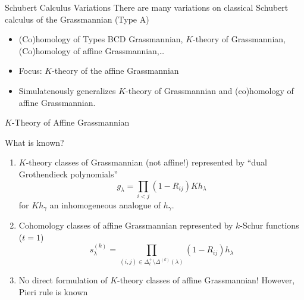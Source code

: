 \documentclass{beamer}
\begin{document}
\begin{frame}{Schubert Calculus Variations}
  There are many variations on classical Schubert calculus of the
  Grassmannian (Type A)
  \begin{itemize}
  \item (Co)homology of Types BCD Grassmannian, \(K\)-theory of
    Grassmannian, (Co)homology of affine Grassmannian,\ldots 
  \item Focus: \(K\)-theory of the affine Grassmannian
  \item Simulatenously generalizes \(K\)-theory of Grassmannian and
    (co)homology of affine Grassmannian. 
  \end{itemize}
\end{frame}
\begin{frame}{\(K\)-Theory of Affine Grassmannian}
  \begin{block}{What is known?}
    \begin{enumerate}
    \item \(K\)-theory classes of Grassmannian (not affine!)
      represented by
      ``dual Grothendieck 
      polynomials'' \[
        g_\lambda = \prod_{i < j} (1-R_{ij}) Kh_\lambda
      \]
      for \(Kh_\gamma\) an inhomogeneous analogue of \(h_\gamma\).
    \item Cohomology classes of affine Grassmannian represented by
      \(k\)-Schur functions (\(t=1\)) \[
        s_\lambda^{(k)} = \prod_{(i,j) \in \Delta^+_\ell \setminus
          \Delta^{(k)}(\lambda)} (1-R_{ij}) h_\lambda
      \]
    \item No direct formulation of \(K\)-theory classes of affine
      Grassmannian! However, Pieri rule is known~
    \end{enumerate}
  \end{block}
\end{frame}
\end{document}
